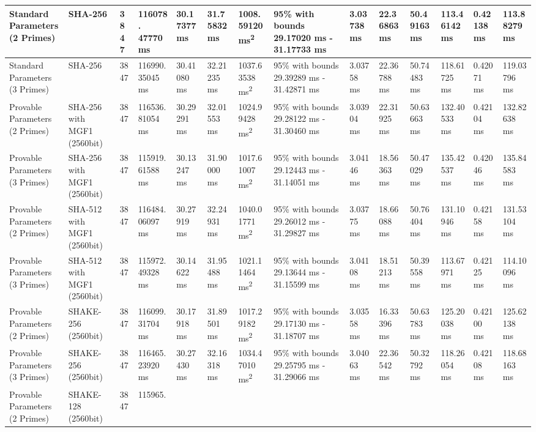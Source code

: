 \documentclass[]{final_report}
\theoremstyle{definition}
\begin{document}
\begin{landscape}
\begin{longtable}{|p{2.3cm}|p{1.8cm}|p{1.0cm}|p{1.7cm}|p{1.2cm}|p{1.5cm}|p{1.8cm}|p{1.5cm}|p{1.2cm}|p{1.5cm}|p{1.3cm}|p{1.4cm}|p{1.3cm}|p{1.5cm}|}
Standard Parameters (2 Primes) & SHA-256 & 3847 & 116078.
47770 ms & 30.17377 ms & 31.75832 ms & 1008.59120 ms\textsuperscript{2} & 95\% with bounds 29.17020 ms - 31.17733 ms & 3.03738 ms & 22.36863 ms & 50.49163 ms & 113.46142 ms & 0.42138 ms & 113.88279 ms \\
\hline
Standard Parameters (3 Primes) & SHA-256 & 3847 & 116990.
35045 ms & 30.41080 ms & 32.21235 ms & 1037.63538 ms\textsuperscript{2} & 95\% with bounds 29.39289 ms - 31.42871 ms & 3.03758 ms & 22.36788 ms & 50.74483 ms & 118.61725 ms & 0.42071 ms & 119.03796 ms \\
\hline
Provable Parameters (2 Primes) & SHA-256 with MGF1 (2560bit) & 3847 & 116536.
81054 ms & 30.29291 ms & 32.01553 ms & 1024.99428 ms\textsuperscript{2} & 95\% with bounds 29.28122 ms - 31.30460 ms & 3.03904 ms & 22.31925 ms & 50.63663 ms & 132.40533 ms & 0.42104 ms & 132.82638 ms \\
\hline
Provable Parameters (3 Primes) & SHA-256 with MGF1 (2560bit) & 3847 & 115919.
61588 ms & 30.13247 ms & 31.90000 ms & 1017.61007 ms\textsuperscript{2} & 95\% with bounds 29.12443 ms - 31.14051 ms & 3.04146 ms & 18.56363 ms & 50.47029 ms & 135.42537 ms & 0.42046 ms & 135.84583 ms \\
\hline
Provable Parameters (2 Primes) & SHA-512 with MGF1 (2560bit) & 3847 & 116484.
06097 ms & 30.27919 ms & 32.24931 ms & 1040.01771 ms\textsuperscript{2} & 95\% with bounds 29.26012 ms - 31.29827 ms & 3.03775 ms & 18.66088 ms & 50.76404 ms & 131.10946 ms & 0.42158 ms & 131.53104 ms \\
\hline
Provable Parameters (3 Primes) & SHA-512 with MGF1 (2560bit) & 3847 & 115972.
49328 ms & 30.14622 ms & 31.95488 ms & 1021.11464 ms\textsuperscript{2} & 95\% with bounds 29.13644 ms - 31.15599 ms & 3.04108 ms & 18.51213 ms & 50.39558 ms & 113.67971 ms & 0.42125 ms & 114.10096 ms \\
\hline
Provable Parameters (2 Primes) & SHAKE-256 (2560bit) & 3847 & 116099.
31704 ms & 30.17918 ms & 31.89501 ms & 1017.29182 ms\textsuperscript{2} & 95\% with bounds 29.17130 ms - 31.18707 ms & 3.03558 ms & 16.33396 ms & 50.63783 ms & 125.20038 ms & 0.42100 ms & 125.62138 ms \\
\hline
Provable Parameters (3 Primes) & SHAKE-256 (2560bit) & 3847 & 116465.
23920 ms & 30.27430 ms & 32.16318 ms & 1034.47010 ms\textsuperscript{2} & 95\% with bounds 29.25795 ms - 31.29066 ms & 3.04063 ms & 22.36542 ms & 50.32792 ms & 118.26054 ms & 0.42108 ms & 118.68163 ms \\
\hline
Provable Parameters (2 Primes) & SHAKE-128 (2560bit) & 3847 & 115965.

\end{longtable}
\end{landscape}
\end{document}
